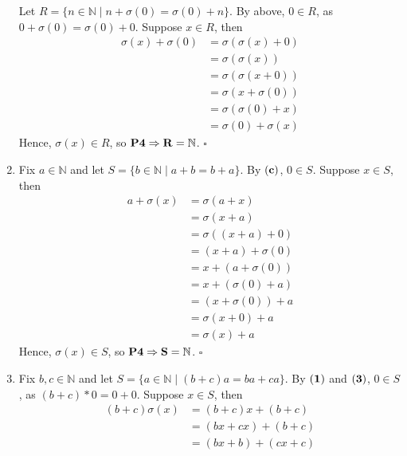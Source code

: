 \documentclass{article}
\newcommand{\N}{\mathbb{N}}
\begin{document}
\begin{enumerate}[label=\textbf{(\alph*)}]
{      Let $R=\{n\in\N\mid n+\sigma(0)=\sigma(0)+n\}$. By above, $0\in R$, as
      $0+\sigma(0)=\sigma(0)+0$. Suppose $x\in R$, then
      \begin{align*}
        \sigma(x)+\sigma(0) &= \sigma(\sigma(x)+0)    \tag{2} \\
                            &= \sigma(\sigma(x))      \tag{1} \\
                            &= \sigma(\sigma(x+0))    \tag{1} \\
                            &= \sigma(x+\sigma(0))    \tag{2} \\
                            &= \sigma(\sigma(0)+x)    \tag{IH} \\
                            &= \sigma(0)+\sigma(x)    \tag{2}
      \end{align*}
      Hence, $\sigma(x) \in R$, so $\bf{P4}\Rightarrow R=\N$.
      \hfill $\square$
    }
    \item{
      Fix $a\in\N$ and let $S=\{b\in\N\mid a+b=b+a\}$. By $\bf{(c)}$, $0\in S$.
      Suppose $x\in S$, then
      \begin{align*}
        a+\sigma(x) &= \sigma(a+x)      \tag{2} \\
                    &= \sigma(x+a)      \tag{IH}\\
                    &= \sigma((x+a)+0)  \tag{1} \\
                    &= (x+a)+\sigma(0)  \tag{2} \\
                    &= x+(a+\sigma(0))  \tag{b} \\
                    &= x+(\sigma(0)+a)  \tag{c} \\
                    &= (x+\sigma(0))+a  \tag{b} \\
                    &= \sigma(x+0)+a    \tag{2} \\
                    &= \sigma(x)+a      \tag{1}
      \end{align*}
      Hence, $\sigma(x) \in S$, so $\bf{P4}\Rightarrow S=\N$.
      \hfill $\square$
    }
    \item{
      Fix $b,c\in\N$ and let $S=\{a\in\N\mid(b+c)a=ba+ca\}$. By $\bf{(1)}$ and
      $\bf{(3)}$, $0\in S$, as $(b+c)*0=0+0$. Suppose $x\in S$, then
      \begin{align*}
        (b+c)\sigma(x)  &= (b+c)x+(b+c)           \tag{4}  \\
                        &= (bx+cx)+(b+c)          \tag{IH} \\
                        &= (bx+b)+(cx+c)          \tag{b,d}\\

\end{align*}}
\end{enumerate}
\end{document}
